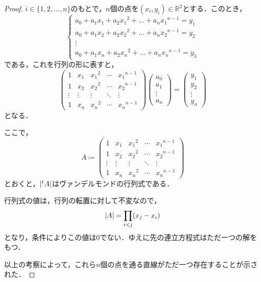 \documentclass[a4paper,10pt,fleqn]{ltjsarticle}
\begin{document}
\begin{tleftbar}
    \begin{proof}
        $i \in \{ 1,2,\ldots,n \}$のもとで，$n$個の点を$(x_i , y_i ) \in \mathbb{R}^2$とする．このとき，
        \[
            \begin{cases}
                a_0 + a_1 x_1 + a_2 {x_1}^2 + \dots + a_n {x_1}^{n-1} = y_1 \\
                a_0 + a_1 x_2 + a_2 {x_2}^2 + \dots + a_n {x_2}^{n-1} = y_2 \\
                \vdots                                                      \\
                a_0 + a_1 x_n + a_2 {x_n}^2 + \dots + a_n {x_n}^{n-1} = y_3
            \end{cases}
        \]
        である，これを行列の形に表すと，
        \[
            \begin{pmatrix}
                1      & x_1    & {x_1}^2 & \cdots & {x_1}^{n-1} \\
                1      & x_2    & {x_2}^2 & \cdots & {x_2}^{n-1} \\
                \vdots & \vdots & \vdots  & \ddots & \vdots      \\
                1      & x_n    & {x_n}^2 & \cdots & {x_n}^{n-1}
            \end{pmatrix}
            \begin{pmatrix}
                a_0    \\
                a_1    \\
                \vdots \\
                a_n
            \end{pmatrix}
            =
            \begin{pmatrix}
                y_1    \\
                y_2    \\
                \vdots \\
                y_n
            \end{pmatrix}
        \]
        となる．

        ここで，
        \[
            A \coloneqq
            \begin{pmatrix}
                1      & x_1    & {x_1}^2 & \cdots & {x_1}^{n-1} \\
                1      & x_2    & {x_2}^2 & \cdots & {x_2}^{n-1} \\
                \vdots & \vdots & \vdots  & \ddots & \vdots      \\
                1      & x_n    & {x_n}^2 & \cdots & {x_n}^{n-1}
            \end{pmatrix}
        \]
        とおくと，$\abs{{}^t A}$はヴァンデルモンドの行列式である．

        行列式の値は，行列の転置に対して不変なので，
        \[
            \abs{A}= \prod_{i < j} (x_j - x_i)
        \]
        となり，条件によりこの値は$0$でない．ゆえに先の連立方程式はただ一つの解をもつ．

        以上の考察によって，これら$n$個の点を通る直線がただ一つ存在することが示された．
    \end{proof}
\end{tleftbar}
\end{document}
